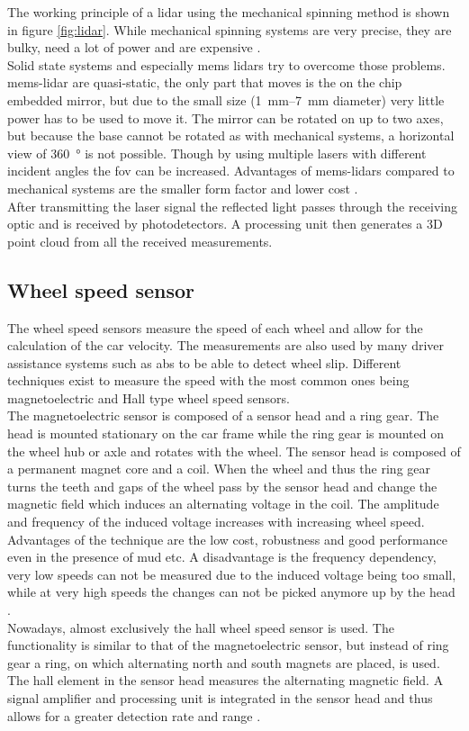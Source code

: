 The working principle of a \gls{lidar} using the mechanical spinning method is shown in figure \ref{fig:lidar}.
While mechanical spinning systems are very precise, they are bulky, need a lot of power and are expensive \cite{Vaughan2006}.\\
Solid state systems and especially \gls{mems} \gls{lidar}s try to overcome those problems.
\gls{mems}-\gls{lidar} are quasi-static, the only part that moves is the on the chip embedded mirror, but due to the small size (\SIrange{1}{7}{\milli\metre} diameter) very little power has to be used to move it.
The mirror can be rotated on up to two axes, but because the base cannot be rotated as with mechanical systems, a horizontal view of \SI{360}{\degree} is not possible.
Though by using multiple lasers with different incident angles the \gls{fov} can be increased.
Advantages of \gls{mems}-\gls{lidar}s compared to mechanical systems are the smaller form factor and lower cost \cite{Wang2020}.\\
After transmitting the laser signal the reflected light passes through the receiving optic and is received by photodetectors.
A processing unit then generates a 3D point cloud from all the received measurements.


\subsection{Wheel speed sensor}
The wheel speed sensors measure the speed of each wheel and allow for the calculation of the car velocity.
The measurements are also used by many driver assistance systems such as \gls{abs} to be able to detect wheel slip.
Different techniques exist to measure the speed with the most common ones being magnetoelectric and Hall type wheel speed sensors.\\
The magnetoelectric sensor is composed of a sensor head and a ring gear.
The head is mounted stationary on the car frame while the ring gear is mounted on the wheel hub or axle and rotates with the wheel.
The sensor head is composed of a permanent magnet core and a coil.
When the wheel and thus the ring gear turns the teeth and gaps of the wheel pass by the sensor head and change the magnetic field which induces an alternating voltage in the coil.
The amplitude and frequency of the induced voltage increases with increasing wheel speed.
Advantages of the technique are the low cost, robustness and good performance even in the presence of mud etc.
A disadvantage is the frequency dependency, very low speeds can not be measured due to the induced voltage being too small, while at very high speeds the changes can not be picked anymore up by the head \cite{AutoReif2014}.\\
Nowadays, almost exclusively the hall wheel speed sensor is used.
The functionality is similar to that of the magnetoelectric sensor, but instead of ring gear a ring, on which alternating north and south magnets are placed, is used.
The hall element in the sensor head measures the alternating magnetic field.
A signal amplifier and processing unit is integrated in the sensor head and thus allows for a greater detection rate and range \cite{Re2011}.


